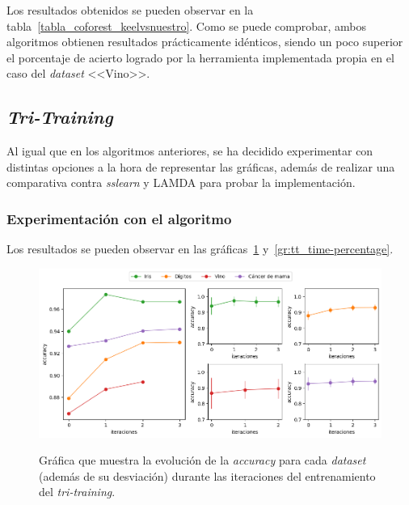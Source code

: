 Los resultados obtenidos se pueden observar en la tabla~\ref{tabla_coforest_keelvsnuestro}. Como se puede comprobar, ambos algoritmos obtienen resultados prácticamente idénticos, siendo un poco superior el porcentaje de acierto logrado por la herramienta implementada propia en el caso del \textit{dataset} <<Vino>>.


\subsection{\textit{Tri-Training}}

Al igual que en los algoritmos anteriores, se ha decidido experimentar con distintas opciones a la hora de representar las gráficas, además de realizar una comparativa contra \textit{sslearn} y LAMDA para probar la implementación.


\subsubsection{Experimentación con el algoritmo}

Los resultados se pueden observar en las gráficas~\ref{gr:tt_train-iterations} y~\ref{gr:tt_time-percentage}.

\begin{figure}[h]
	\caption[\textit{Tri-training}: resultados experimentación (iteraciones-entrenamiento)]{Gráfica que muestra la evolución de la \textit{accuracy} para cada \textit{dataset} (además de su desviación) durante las iteraciones del entrenamiento del \textit{tri-training}.}
	\centering
	\includegraphics[scale=0.5]{../img/memoria/5_tritraining_score-iteraciones}
	\label{gr:tt_train-iterations}
\end{figure}

